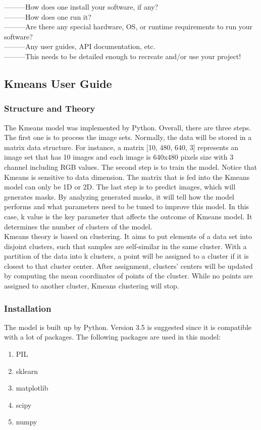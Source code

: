\documentclass[10pt,journal,compsoc, draftclsnofoot,onecolumn]{IEEEtran}
\begin{document}
---------How does one install your software, if any? \\
---------How does one run it? \\ 
---------Are there any special hardware, OS, or runtime requirements to run your software? \\
---------Any user guides, API documentation, etc. \\

---------This needs to be detailed enough to recreate and/or use your project!

\subsection{Kmeans User Guide}
\subsubsection{Structure and Theory}
The Kmeans model was implemented by Python. Overall, there are three steps. The first one is to process the image sets. Normally, the data will be stored in a matrix data structure. For instance, a matrix [10, 480, 640, 3] represents an image set that has 10 images and each image is 640x480 pixels size with 3 channel including RGB values. The second step is to train the model. Notice that Kmeans is sensitive to data dimension. The matrix that is fed into the Kmeans model can only be 1D or 2D. The last step is to predict images, which will generates masks. By analyzing generated masks, it will tell how the model performs and what parameters need to be tuned to improve this model. In this case, k value is the key parameter that affects the outcome of Kmeans model. It determines the number of clusters of the model. \\

\noindent
Kmeans theory is based on clustering. It aims to put elements of a data set into disjoint clusters, such that samples are self-similar in the same cluster. With a partition of the data into k clusters, a point will be assigned to a cluster if it is closest to that cluster center. After assignment, clusters' centers will be updated by computing the mean coordinates of points of the cluster. While no points are assigned to another cluster, Kmeans clustering will stop.

\subsubsection{Installation}
The model is built up by Python. Version 3.5 is suggested since it is compatible with a lot of packages. The following packages are used in this model:
\begin{enumerate}
\item PIL
\item sklearn
\item matplotlib
\item scipy
\item numpy
\end{enumerate}
\end{document}
